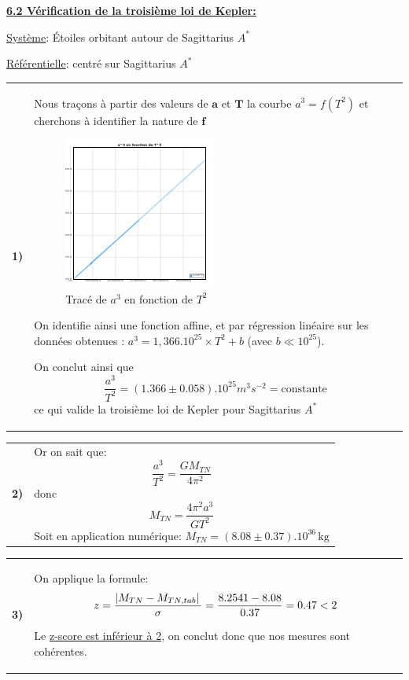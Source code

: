 \documentclass{article}
\newcommand{\expart}[1]
{
    \textbf{\underline{#1:}} \par 
}
\newcommand{\un}[1]{
    \,\text{#1}
}
\newcommand{\question}[2]
{
    \begin{tabularx}{\linewidth}{lX}
        \textbf{#1)} & {#2}
    \end{tabularx} 
}
\begin{document}
\expart{6.2 Vérification de la troisième loi de Kepler}

\underline{Système}: Étoiles orbitant autour de Sagittarius $A^*$

\underline{Référentielle}: centré sur Sagittarius $A^*$

\question{1}{
  Nous traçons à partir des valeurs de $\boldsymbol{a}$ et $\boldsymbol{T}$ la courbe $a^3=f(T^2)$ et cherchons à identifier la nature de $\boldsymbol{f}$
  \begin{figure}[H]
    \centering
    \includegraphics[width=50mm]{img/third_law.png}
    \caption{Tracé de $a^3$ en fonction de $T^2$}
  \end{figure}
  On identifie ainsi une fonction affine, et par régression linéaire sur les données obtenues : $a^3=1,366.10^{25}\times T^2+b$ (avec $b\ll10^{25}$).

  On conclut ainsi que 
  $$\boxed{\frac{a^3}{T^2}=(1.366\pm0.058).10^{25} m^3s^{-2}=\text{constante}}$$  ce qui valide la troisième loi de Kepler pour Sagittarius $A^*$
}

\question{2}{
  Or on sait que:
  $$
  \frac{a^3}{T^2}=\frac{GM_{TN}}{4\pi^2}
  $$
  donc
  $$
  \boxed{M_{TN}=\frac{4\pi^2a^3}{GT^2}}
  $$
  Soit en application numérique: $\boxed{M_{TN}=(8.08\pm0.37).10^{36} \un{kg}}$
}

\question{3}{
  On applique la formule:
  $$
    z=\frac{\abs*{M_{TN}-M_{TN,tab}}}{\sigma}=\frac{8.2541-8.08}{0.37}=0.47 < 2
  $$

  Le \underline{z-score est inférieur à 2}, on conclut donc que nos mesures sont cohérentes.
}
\end{document}
